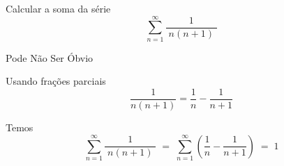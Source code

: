\begin{question}

 Calcular a soma da série
	\[
    \sum_{n=1}^{\infty} \frac{1}{\;n(n+1)\;}
  \]

\end{question}

\begin{resolution}{Pode Não Ser Óbvio}

  Usando frações parciais
  \[
    \frac{1}{n(n+1)} = \frac{1}{n} - \frac{1}{n+1}
  \]

  \pause
  Temos
  \[
    \sum_{n=1}^{\infty} \frac{1}{\;n(n+1)\;}
    \;=\; \sum_{n=1}^{\infty} \left( \frac{1}{n} - \frac{1}{n+1} \right)
    \;=\; 1
  \]
\end{resolution}

